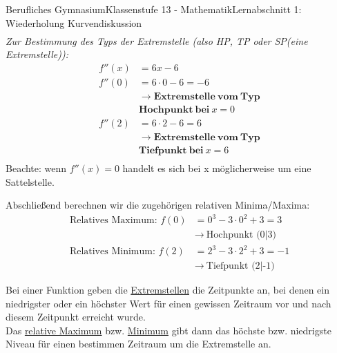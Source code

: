 \documentclass[11pt,twocolumn,oneside,openany,headings=optiontotoc,11pt,numbers=noenddot]{article}
\begin{document}
\begin{worksheet}{Berufliches Gymnasium}{Klassenstufe 13 - Mathematik}{Lernabschnitt 1: Wiederholung Kurvendiskussion}
\begin{align*}
		\end{align*}
		\textit{Zur Bestimmung des Typs der Extremstelle (also HP, TP oder SP(eine Extremstelle)):}
		\begin{align*}
			f''(x) & = 6x - 6\\
			f''(0) & = 6\cdot{}0 - 6 = -6\\
			& \rightarrow \mathbf{Extremstelle\ vom\ Typ}\\
			& \mathbf{Hochpunkt\ bei\ } x = 0\\
			f''(2) & = 6\cdot{}2 - 6 = 6\\
			& \rightarrow \mathbf{Extremstelle\ vom\ Typ}\\
			& \mathbf{Tiefpunkt\ bei\ } x = 6\\
		\end{align*}
		Beachte: wenn \(f''(x) = 0\) handelt es sich bei x möglicherweise um eine Sattelstelle.\\
		\par\bigskip\noindent
		Abschließend berechnen wir die zugehörigen relativen Minima/Maxima:
		\begin{align*}
			\text{Relatives Maximum: } f(0) & = 0^3 -3\cdot{}0^2 + 3 = 3\\
			& \rightarrow\ \text{Hochpunkt (0|3)}\\
			\text{Relatives Minimum: } f(2) & = 2^3 -3\cdot{}2^2 + 3 = -1\\
			& \rightarrow\ \text{Tiefpunkt (2|-1)}
		\end{align*}
		\begin{framed}
			\noindent
			Bei einer Funktion geben die \underline{Extremstellen} die Zeitpunkte an, bei denen ein niedrigster oder ein höchster Wert für einen gewissen Zeitraum vor und nach diesem Zeitpunkt erreicht wurde.\\
			Das \underline{relative Maximum} bzw. \underline{Minimum} gibt dann das höchste bzw. niedrigste Niveau für einen bestimmen Zeitraum um die Extremstelle an.
		\end{framed}

\end{worksheet}
\end{document}
